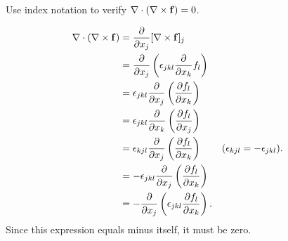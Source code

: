 \documentclass[10pt, a4paper]{article}
\begin{document}
\begin{example}
    Use index notation to verify $\bnabla \cdot (\bnabla \times \vec{f}) = 0$.

    \begin{solution}
        \begin{align*}
            \bnabla \cdot (\bnabla \times \vec{f}) &= \pd{x_j}[\bnabla \times \vec{f}]_j \\
            &= \pd{x_j}\left(\epsilon_{jkl}\pd{x_k}f_l\right) \\
            &= \epsilon_{jkl}\pd{x_j}\left(\pd[f_l]{x_k}\right) \\
            &= \epsilon_{jkl}\pd{x_k}\left(\pd[f_l]{x_j}\right) \\
            &= \epsilon_{kjl}\pd{x_j}\left(\pd[f_l]{x_k}\right) &&(\epsilon_{kjl} = -\epsilon_{jkl}). \\
            &= -\epsilon_{jkl}\pd{x_j}\left(\pd[f_l]{x_k}\right) \\
            &= -\pd{x_j}\left(\epsilon_{jkl}\pd[f_l]{x_k}\right).
        \end{align*}
        Since this expression equals minus itself,
        it must be zero.
    \end{solution}
\end{example}
\end{document}
